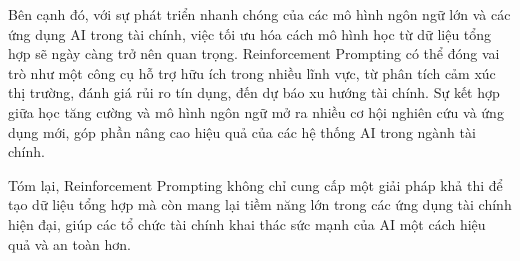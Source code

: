 \documentclass[a4paper,10pt]{article}
\begin{document}
Bên cạnh đó, với sự phát triển nhanh chóng của các mô hình ngôn ngữ lớn và các ứng dụng AI trong tài chính, việc tối ưu hóa cách mô hình học từ dữ liệu tổng hợp sẽ ngày càng trở nên quan trọng. Reinforcement Prompting có thể đóng vai trò như một công cụ hỗ trợ hữu ích trong nhiều lĩnh vực, từ phân tích cảm xúc thị trường, đánh giá rủi ro tín dụng, đến dự báo xu hướng tài chính. Sự kết hợp giữa học tăng cường và mô hình ngôn ngữ mở ra nhiều cơ hội nghiên cứu và ứng dụng mới, góp phần nâng cao hiệu quả của các hệ thống AI trong ngành tài chính.

Tóm lại, Reinforcement Prompting không chỉ cung cấp một giải pháp khả thi để tạo dữ liệu tổng hợp mà còn mang lại tiềm năng lớn trong các ứng dụng tài chính hiện đại, giúp các tổ chức tài chính khai thác sức mạnh của AI một cách hiệu quả và an toàn hơn.

\end{document}
